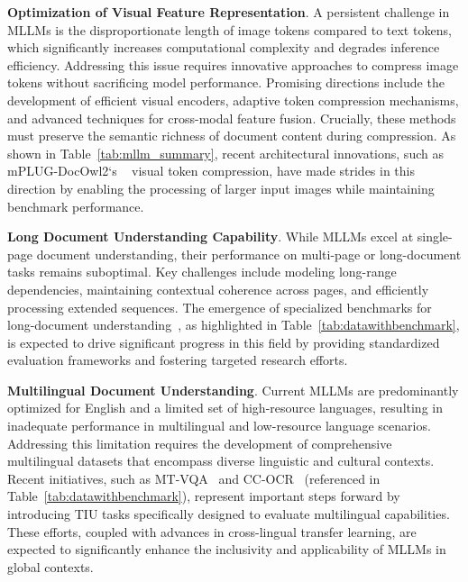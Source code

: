 \noindent \textbf{Optimization of Visual Feature Representation}. A persistent challenge in MLLMs is the disproportionate length of image tokens compared to text tokens, which significantly increases computational complexity and degrades inference efficiency. Addressing this issue requires innovative approaches to compress image tokens without sacrificing model performance. Promising directions include the development of efficient visual encoders, adaptive token compression mechanisms, and advanced techniques for cross-modal feature fusion. Crucially, these methods must preserve the semantic richness of document content during compression. As shown in Table~\ref{tab:mllm_summary}, recent architectural innovations, such as mPLUG-DocOwl2‘s ~\cite{Hu2024ARXIV_mPLUG_DocOwl2_High} visual token compression, have made strides in this direction by enabling the processing of larger input images while maintaining benchmark performance.

\noindent \textbf{Long Document Understanding Capability}. While MLLMs excel at single-page document understanding, their performance on multi-page or long-document tasks remains suboptimal. Key challenges include modeling long-range dependencies, maintaining contextual coherence across pages, and efficiently processing extended sequences. The emergence of specialized benchmarks for long-document understanding~\cite{Ma2024NEURIPS_MMLongBench_Doc_Benchmarking}, as highlighted in Table~\ref{tab:datawithbenchmark}, is expected to drive significant progress in this field by providing standardized evaluation frameworks and fostering targeted research efforts.

\noindent \textbf{Multilingual Document Understanding}. Current MLLMs are predominantly optimized for English and a limited set of high-resource languages, resulting in inadequate performance in multilingual and low-resource language scenarios. Addressing this limitation requires the development of comprehensive multilingual datasets that encompass diverse linguistic and cultural contexts. Recent initiatives, such as MT-VQA~\cite{tang2024mtvqa} and CC-OCR~\cite{yang2024cc} (referenced in Table~\ref{tab:datawithbenchmark}), represent important steps forward by introducing TIU tasks specifically designed to evaluate multilingual capabilities. These efforts, coupled with advances in cross-lingual transfer learning, are expected to significantly enhance the inclusivity and applicability of MLLMs in global contexts.

